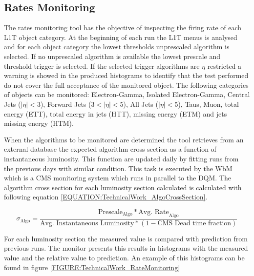 \subsection{Rates Monitoring}
\label{SECTION:TechnicalWork_L1TDQM_RatesMonitoring}


The rates monitoring tool has the objective of inspecting the firing rate of each \gls{L1T} object category. At the beginning of each run the \gls{L1T} menus is analysed and for each object category the lowest thresholds unprescaled algorithm is selected. If no unprescaled algorithm is available the lowest prescale and threshold trigger is selected. If the selected trigger algorithms are $\eta$ restricted a warning is showed in the produced histograms to identify that the test performed do not cover the full acceptance of the monitored object. The following categories of objects can be monitored: Electron-Gamma, Isolated Electron-Gamma, Central Jets ($|\eta|<3$), Forward Jets ($3<|\eta|<5$), All Jets ($|\eta|<5$), Taus, Muon, total energy (ETT), total energy in jets (HTT), missing energy (ETM) and jets missing energy (HTM).

When the algorithms to be monitored are determined the tool retrieves from an external database the expected algorithm cross section as a function of instantaneous luminosity. This function are updated daily by fitting runs from the previous days with similar condition. This task is executed by the \gls{WbM} which is a \gls{CMS} monitoring system which runs in parallel to the \gls{DQM}. The algorithm cross section for each luminosity section calculated is calculated with following equation \ref{EQUATION:TechnicalWork_AlgoCrossSection}.

\begin{equation}
\sigma_{\text{Algo}}=\frac{\text{Prescale}_{\text{Algo}}*{\text{Avg. Rate}_{\text{Algo}}}}{\text{Avg. Instantaneous Luminosity}*(1-\text{CMS Dead time fraction})}
\label{EQUATION:TechnicalWork_AlgoCrossSection}
\end{equation}

For each luminosity section the measured value is compared with prediction from previous runs. The monitor presents this results in histograms with the measured value and the relative value to prediction. An example of this histograms can be found in figure \ref{FIGURE:TechnicalWork_RateMonitoring}

